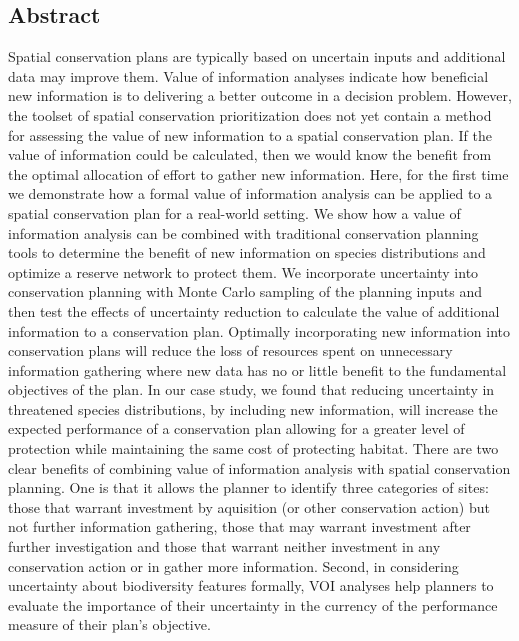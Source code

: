 
\subsection*{Abstract}\label{abstract}

Spatial conservation plans are typically based on uncertain inputs and additional data may improve them. Value of information analyses indicate how beneficial new information is to delivering a better outcome in a decision problem. However, the toolset of spatial conservation prioritization does not yet contain a method for assessing the value of new information to a spatial conservation plan. If the value of information could be calculated, then we would know the benefit from the optimal allocation of effort to gather new information. Here, for the first time we demonstrate how a formal value of information analysis can be applied to a spatial conservation plan for a real-world setting. We show how a value of information analysis can be combined with traditional conservation planning tools to determine the benefit of new information on species distributions and optimize a reserve network to protect them. We incorporate uncertainty into conservation planning with Monte Carlo sampling of the planning inputs and then test the effects of uncertainty reduction to calculate the value of additional information to a conservation plan. Optimally incorporating new information into conservation plans will reduce the loss of resources spent on unnecessary information gathering where new data has no or little benefit to the fundamental objectives of the plan. In our case study, we found that reducing uncertainty in threatened species distributions, by including new information, will increase the expected performance of a conservation plan allowing for a greater level of protection while maintaining the same cost of protecting habitat. There are two clear benefits of combining value of information analysis with spatial conservation planning. One is that it allows the planner to identify three categories of sites: those that warrant investment by aquisition (or other conservation action) but not further information gathering, those that may warrant investment after further investigation and those that warrant neither investment in any conservation action or in gather more information. Second, in considering uncertainty about biodiversity features formally, VOI analyses help planners to evaluate the importance of their uncertainty in the currency of the performance measure of their plan's objective.
